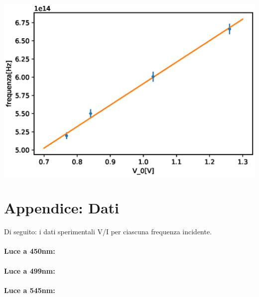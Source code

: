 \documentclass[10pt,a4paper]{article}
\begin{document}
	\begin{minipage}{.4\linewidth}
		
		\label{tab:124}
\end{minipage}\newline\newline
\newline
\begin{minipage}{.6\linewidth}
		\centering
		\includegraphics[width=\linewidth]{immagini/fit.eps}
		\label{fig:circuito-1}
	\end{minipage}
	\begin{minipage}{.4\linewidth}
		
		\label{tab:124}
\end{minipage}\newline\newline
\newline
\section*{Appendice: Dati}
\noindent
Di seguito: i dati sperimentali V/I per ciascuna frequenza incidente.\\
\paragraph{Luce a 450nm:}


\paragraph{Luce a 499nm:}


\paragraph{Luce a 545nm:}

\end{document}
